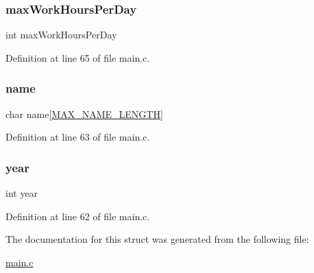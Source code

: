 \subsubsection{\texorpdfstring{max\+Work\+Hours\+Per\+Day}{maxWorkHoursPerDay}}
{\footnotesize\ttfamily int max\+Work\+Hours\+Per\+Day}



Definition at line 65 of file main.\+c.

\hypertarget{structclass_ad50982abf9e9bbbc784f8f17fa25b1b2}{}\label{structclass_ad50982abf9e9bbbc784f8f17fa25b1b2} 
\subsubsection{\texorpdfstring{name}{name}}
{\footnotesize\ttfamily char name\mbox{[}\hyperlink{main_8c_a0c397a708cec89c74029582574516b30}{M\+A\+X\+\_\+\+N\+A\+M\+E\+\_\+\+L\+E\+N\+G\+TH}\mbox{]}}



Definition at line 63 of file main.\+c.

\hypertarget{structclass_abeac221e38b7b9ce7df8722c842bf671}{}\label{structclass_abeac221e38b7b9ce7df8722c842bf671} 
\subsubsection{\texorpdfstring{year}{year}}
{\footnotesize\ttfamily int year}



Definition at line 62 of file main.\+c.



The documentation for this struct was generated from the following file\+:\begin{DoxyCompactItemize}
\item 
\hyperlink{main_8c}{main.\+c}\end{DoxyCompactItemize}
